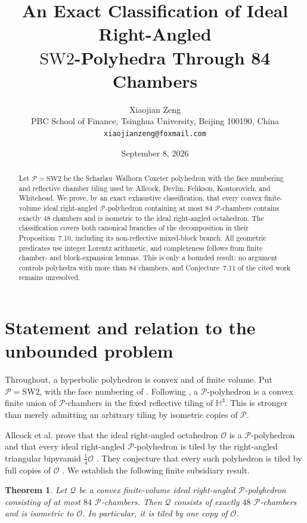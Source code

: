 \documentclass[11pt]{article}
\title{An Exact Classification of Ideal Right-Angled\\
$\mathrm{SW2}$-Polyhedra Through 84 Chambers}
\author{Xiaojian Zeng\\
\small PBC School of Finance, Tsinghua University, Beijing 100190, China\\
\small \texttt{xiaojianzeng@foxmail.com}}
\date{September 8, 2026}
\newtheorem{theorem}{Theorem}
\theoremstyle{remark}
\newcommand{\HH}{\mathbb H}
\newcommand{\OO}{\mathcal O}
\newcommand{\PP}{\mathcal P}
\newcommand{\QQ}{\mathcal Q}
\begin{document}
\maketitle

\begin{abstract}
Let $\PP=\mathrm{SW2}$ be the Scharlau--Walhorn Coxeter polyhedron with
the face numbering and reflective chamber tiling used by Allcock, Devlin,
Felikson, Kontorovich, and Whitehead.  We prove, by an exact exhaustive
classification, that every convex finite-volume ideal right-angled
$\PP$-polyhedron containing at most $84$ $\PP$-chambers contains exactly
$48$ chambers and is isometric to the ideal right-angled octahedron.
The classification covers both canonical branches of the decomposition in
their Proposition~7.10, including its non-reflective mixed-block branch.
All geometric predicates use integer Lorentz arithmetic, and completeness
follows from finite chamber- and block-expansion lemmas.  This is only a
bounded result: no argument controls polyhedra with more than $84$ chambers,
and Conjecture~7.11 of the cited work remains unresolved.
\end{abstract}

\section{Statement and relation to the unbounded problem}

Throughout, a hyperbolic polyhedron is convex and of finite volume.  Put
$\PP=\mathrm{SW2}$, with the face numbering of
\cite[Appendix~B]{allcock2026arithmetic}.  Following
\cite[Definition~2.1]{allcock2026arithmetic}, a $\PP$-polyhedron is a
convex finite union of $\PP$-chambers in the fixed reflective tiling of
$\HH^3$.  This is stronger than merely admitting an arbitrary tiling by
isometric copies of $\PP$.

Allcock et al. prove that the ideal right-angled octahedron $\OO$ is a
$\PP$-polyhedron and that every ideal right-angled $\PP$-polyhedron is
tiled by the right-angled triangular bipyramid $\tfrac14\OO$
\cite[Proposition~7.10]{allcock2026arithmetic}.  They conjecture that every
such polyhedron is tiled by full copies of $\OO$
\cite[Conjecture~7.11]{allcock2026arithmetic}.  We establish the following
finite subsidiary result.

\begin{theorem}\label{thm:main}
Let $\QQ$ be a convex finite-volume ideal right-angled $\PP$-polyhedron
consisting of at most $84$ $\PP$-chambers.  Then $\QQ$ consists of exactly
$48$ $\PP$-chambers and is isometric to $\OO$.  In particular, it is tiled
by one copy of $\OO$.
\end{theorem}
\end{document}
